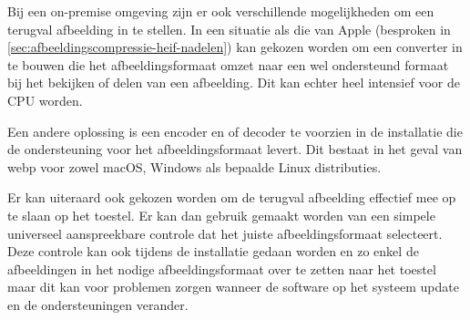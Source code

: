 Bij een \gls{on-premise} omgeving zijn er ook verschillende mogelijkheden om een terugval afbeelding in te stellen. In een situatie als die van Apple (besproken in \ref{sec:afbeeldingscompressie-heif-nadelen}) kan gekozen worden om een converter in te bouwen die het \gls{afbeeldingsformaat} omzet naar een wel ondersteund formaat bij het bekijken of delen van een afbeelding. Dit kan echter heel intensief voor de CPU worden.

Een andere oplossing is een encoder en of decoder te voorzien in de installatie die de ondersteuning voor het \gls{afbeeldingsformaat} levert. Dit bestaat in het geval van \gls{webp} voor zowel macOS, Windows als bepaalde Linux distributies.

Er kan uiteraard ook gekozen worden om de terugval afbeelding effectief mee op te slaan op het toestel. Er kan dan gebruik gemaakt worden van een simpele universeel aanspreekbare controle dat het juiste afbeeldingsformaat selecteert. Deze controle kan ook tijdens de installatie gedaan worden en zo enkel de afbeeldingen in het nodige \gls{afbeeldingsformaat} over te zetten naar het toestel maar dit kan voor problemen zorgen wanneer de software op het systeem update en de ondersteuningen verander.